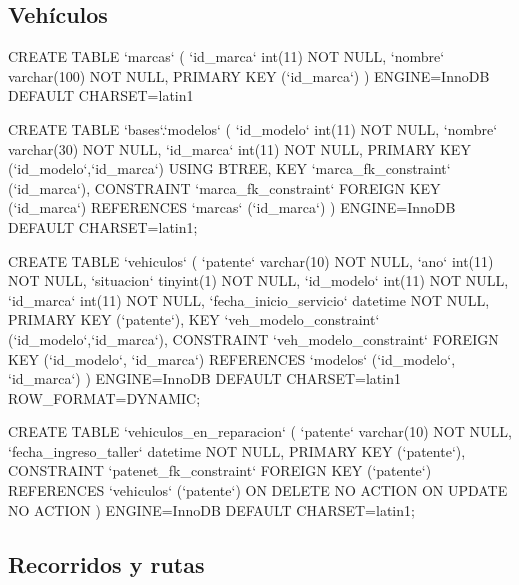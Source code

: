\subsection{Veh\'iculos}

\begin{sql}


CREATE TABLE  `marcas` (
  `id_marca` int(11) NOT NULL,
  `nombre` varchar(100) NOT NULL,
  PRIMARY KEY (`id_marca`)
) ENGINE=InnoDB DEFAULT CHARSET=latin1

CREATE TABLE  `bases`.`modelos` (
  `id_modelo` int(11) NOT NULL,
  `nombre` varchar(30) NOT NULL,
  `id_marca` int(11) NOT NULL,
  PRIMARY KEY (`id_modelo`,`id_marca`) USING BTREE,
  KEY `marca_fk_constraint` (`id_marca`),
  CONSTRAINT `marca_fk_constraint` FOREIGN KEY (`id_marca`) REFERENCES `marcas` (`id_marca`)
) ENGINE=InnoDB DEFAULT CHARSET=latin1;

CREATE TABLE  `vehiculos` (
  `patente` varchar(10) NOT NULL,
  `ano` int(11) NOT NULL,
  `situacion` tinyint(1) NOT NULL,
  `id_modelo` int(11) NOT NULL,
  `id_marca` int(11) NOT NULL,
  `fecha_inicio_servicio` datetime NOT NULL,
  PRIMARY KEY (`patente`),
  KEY `veh_modelo_constraint` (`id_modelo`,`id_marca`),
  CONSTRAINT `veh_modelo_constraint` FOREIGN KEY (`id_modelo`, `id_marca`) 
  REFERENCES `modelos` (`id_modelo`, `id_marca`)
) ENGINE=InnoDB DEFAULT CHARSET=latin1 ROW_FORMAT=DYNAMIC;

CREATE TABLE  `vehiculos_en_reparacion` (
  `patente` varchar(10) NOT NULL,
  `fecha_ingreso_taller` datetime NOT NULL,
  PRIMARY KEY (`patente`),
  CONSTRAINT `patenet_fk_constraint` FOREIGN KEY (`patente`) REFERENCES `vehiculos` (`patente`) 
  ON DELETE NO ACTION ON UPDATE NO ACTION
) ENGINE=InnoDB DEFAULT CHARSET=latin1;


\end{sql}

\subsection{Recorridos y rutas}

